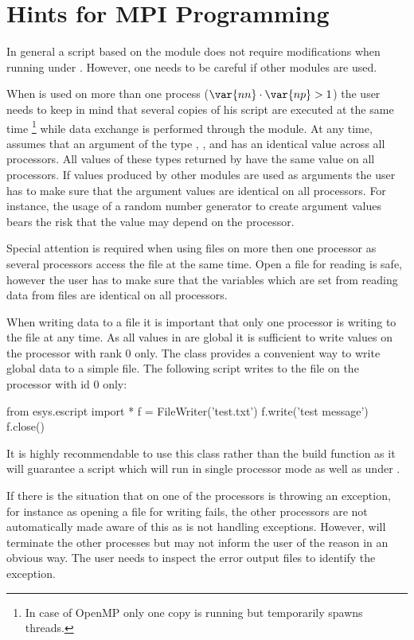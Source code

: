 \section{Hints for MPI Programming}
In general a script based on the \escript module does not require modifications when running under \MPI. However, one needs to be careful if other modules are used. 

When \MPI is used on more than one process ($\var{nn} \cdot \var{np} >1$) the user needs to keep in mind that several copies of his script are executed at the same time 
\footnote{In case of OpenMP only one copy is running but \escript temporarily spawns threads.} while data exchange is performed through the \escript module. At any time, 
\escript assumes that an argument of the type , ,  
and \numpy has an identical value across all processors. All 
values of these types returned by \escript have the same value on all processors.
If values produced by other modules are used as arguments the user has to make sure that the argument values are identical on all processors. For instance, the usage of a random number generator to create argument values bears the risk that the value may depend on the processor. 

Special attention is required when using files on more then one processor as 
several processors access the file at the same time. Open a file for
reading is safe, however the user has to make sure that the variables which are 
set from reading data from files are identical on all processors.

When writing data to a file it is important that only one processor is writing to
the file at any time. As all values in \escript are global it is sufficient
to write values on the processor with \MPI rank $0$ only. 
The  class provides a convenient way to write global data
to a simple file.  The following script writes to the file 
 on the processor with id $0$ only:
\begin{python}
from esys.escript import *
f = FileWriter('test.txt')
f.write('test message')
f.close()
\end{python}
It is highly recommendable to use this class rather than the build 
function as it will guarantee a script which will run in single processor mode as well as under \MPI.

If there is the situation that on one of the processors is throwing an exception, 
for instance as opening a file for writing fails, the other processors 
are not automatically made aware of this as \MPI
is not handling exceptions. However, \MPI will terminate the other processes but 
may not inform the user of the reason in an obvious way. The user needs to inspect the
error output files to identify the exception.
